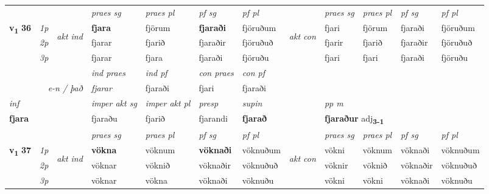 \begin{longtable}[l]{X>{\footnotesize\itshape}llXXXXlXXXX}
 & &   & \textit{praes sg}  & \textit{praes pl}    & \textit{ pf sg} & \textit{pf pl} & & \textit{praes sg}  & \textit{praes pl}    & \textit{pf sg} & \textit{pf pl }  \\ \cmidrule{4-7} \cmidrule{9-12}
 \multirow{2}{*}{{{\textbf{v{\textsubscript{1}}} \Large{\textbf{36}}}}}  & 1p & \multirow{3}{*}{\begin{turn}{90}\textit{akt ind}\end{turn}} & \textbf{fjara} & fjörum & \textbf{fjaraði} & fjöruðum & \multirow{3}{*}{\begin{turn}{90}\textit{akt con}\end{turn}} &fjari & fjörum & fjaraði & fjöruðum\\*
 & 2p &  &  fjarar  & fjarið & fjaraðir & fjöruðuð & & fjarir & fjarið & fjaraðir & fjöruðuð \\*
 & 3p &  & fjarar & fjara & fjaraði & fjöruðu & & fjari & fjari& fjaraði & fjöruðu \\*
\cmidrule{4-7} \cmidrule{9-12}

   && &  \textit{ind praes} & \textit{ind pf} & \textit{con praes} & \textit{con pf} \\*
\multicolumn{3}{r}{\textit{e-n / það}} & fjarar & fjaraði & fjari & fjaraði \\*

\cmidrule{4-7}
   {\textit{inf}} & &  & \textit{imper akt sg} & \textit{imper akt pl}   & \textit{presp} & \textit{supin}  && \textit{pp m} \\*
  {\textbf{fjara}} & && fjaraðu  & fjarið   & fjarandi &  \textbf{fjarað}  && \multicolumn{2}{l}{\textbf{fjaraður} adj\textbf{\textsubscript{3-1}}} \\*

\midrule

 & &   & \textit{praes sg}  & \textit{praes pl}    & \textit{ pf sg} & \textit{pf pl} & & \textit{praes sg}  & \textit{praes pl}    & \textit{pf sg} & \textit{pf pl }  \\ \cmidrule{4-7} \cmidrule{9-12}
 \multirow{2}{*}{{{\textbf{v{\textsubscript{1}}} \Large{\textbf{37}}}}}  & 1p & \multirow{3}{*}{\begin{turn}{90}\textit{akt ind}\end{turn}} & \textbf{vökna} & vöknum & \textbf{vöknaði} & vöknuðum & \multirow{3}{*}{\begin{turn}{90}\textit{akt con}\end{turn}} &vökni & vöknum & vöknaði & vöknuðum\\*
 & 2p &  &  vöknar  & vöknið & vöknaðir & vöknuðuð & & vöknir & vöknið & vöknaðir & vöknuðuð \\*
 & 3p &  & vöknar & vökna & vöknaði & vöknuðu & & vökni & vökni& vöknaði & vöknuðu \\*
\cmidrule{4-7} \cmidrule{9-12}


\end{longtable}
